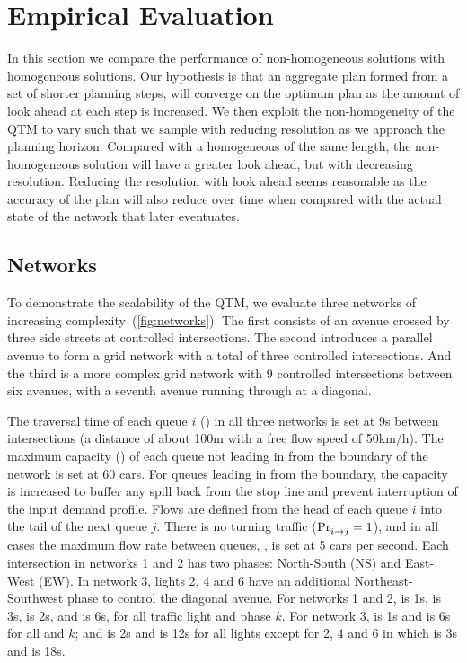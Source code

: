 
\section{Empirical Evaluation}
  
In this section we compare the performance of non-homogeneous solutions 
with homogeneous solutions. Our hypothesis is that an aggregate plan formed 
from a set of shorter planning steps, will 
converge on the optimum plan as the amount of look ahead at each step is 
increased. We then exploit the non-homogeneity of the QTM to vary \vecDT such that we sample with reducing 
resolution as we approach the planning horizon. Compared with a homogeneous 
 \vecDT of the same length, the non-homogeneous solution will have a greater look ahead, but with decreasing resolution. Reducing the resolution with look ahead seems 
reasonable as the accuracy of the plan will also reduce over time when 
compared with the actual state of the network 
that later eventuates. 


\subsection{Networks}

To demonstrate the scalability of the QTM, we evaluate three networks of
increasing complexity~(\cref{fig:networks}). The first consists of an avenue
crossed by three side streets at controlled intersections. The second introduces
a parallel avenue to form a grid network with a total of three controlled
intersections. And the third is a more complex grid network with 9 controlled
intersections between six avenues, with a seventh avenue running through at a
diagonal.


The traversal time of each queue $i$ () in all three networks is set
at 9s between intersections (a distance of about 100m with a free flow speed of
50km/h). The maximum capacity () of each queue not leading in from the
boundary of the network is set at 60 cars. For queues leading in from the
boundary, the capacity is increased to buffer any spill back from the stop line
and prevent interruption of the input demand profile.  Flows are defined from
the head of each queue $i$ into the tail of the next queue $j$. There is no
turning traffic ($\mathrm{Pr}_{i\to j}^{\mathrm{}}=1$), and in all cases the maximum flow rate
between queues, , is set at 5 cars per second. Each intersection in
networks 1 and 2 has two phases: North-South (NS) and East-West (EW). In network
3, lights 2, 4 and 6 have an additional Northeast-Southwest phase to control the
diagonal avenue.  For networks 1 and 2,  is 1s,  is
3s, \CTMIN{\tl} is 2s, and \CTMAX{\tl} is 6s, for all traffic light \tl and
phase $k$.  For network 3,  is 1s and  is 6s for all
\tl and $k$; and \CTMIN{\tl} is 2s and \CTMAX{\tl} is 12s for all lights \tl
except for 2, 4 and 6 in which \CTMIN{\tl} is 3s and \CTMAX{\tl} is 18s.



